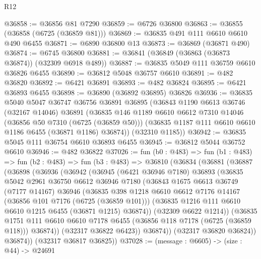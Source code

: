 \begin{lexlean}{R12}
\begin{coremodule}
@36858 := @36856 @81 @7290
@36859 := @6726 @36800
@36863 := @36855 (@36858 (@6725 (@36859 @81)))
@36869 := @36835 @491 @111 @6610 @6610 @490 @6455
@36871 := @6890 @36800 @13
@36873 := @36869 (@36871 @490)
@36874 := @6745 @36800
@36881 := @36841 (@36849 (@36863 (@36873 @36874)) (@32309 @6918 @489))
@36887 := @36835 @5049 @111 @36759 @6610 @36826 @6455
@36890 := @36812 @5048 @36757 @6610
@36891 := @482 @36820
@36892 := @6421 @36891
@36893 := @482 @36824
@36895 := @6421 @36893 @6455
@36898 := @36890 (@36892 @36895) @36826
@36936 := @36835
    @5040
    @5047
    @36747
    @36756
    @36891
    @36895
    (@36843
      @1190
      @6613
      @36746
      (@32167 @14046)
      @36891
      (@36835
        @146
        @1189
        @6610
        @6612
        @7310
        @14046
        (@36856 @50 @7310 (@6725 (@36859 @50)))
        (@36835 @1187 @111 @6610 @6610 @1186 @6455 (@36871 @1186) @36874))
      (@32310 @1185))
@36942 := @36835 @5045 @111 @36754 @6610 @36893 @6455
@36945 := @36812 @5044 @36752 @6610
@36946 := @482 @36822
@37026 := fun (b0 : @483) =>
  fun (b1 : @483) =>
  fun (b2 : @483) =>
  fun (b3 : @483) =>
  @36810
    (@36834
      (@36881
        (@36887
          (@36898
            (@36936
              (@36942
                (@36945
                  (@6421 @36946 @7180)
                  @36893
                  (@36835
                    @5042
                    @2961
                    @36750
                    @6612
                    @36946
                    @7180
                    (@36843
                      @1675
                      @6613
                      @36749
                      (@7177 @14167)
                      @36946
                      (@36835
                        @398
                        @1218
                        @6610
                        @6612
                        @7176
                        @14167
                        (@36856 @101 @7176 (@6725 (@36859 @101)))
                        (@36835 @1216 @111 @6610 @6610 @1215 @6455 (@36871 @1215) @36874))
                      (@32309 @6622 @1214))
                    (@36835
                      @1751
                      @111
                      @6610
                      @6610
                      @7178
                      @6455
                      (@36856 @118 @7178 (@6725 (@36859 @118)))
                      @36874))
                  (@32317 @36822 @6423))
                @36874))
            (@32317 @36820 @36824))
          @36874))
      (@32317 @36817 @36825))
@37028 := (message : @6605) -> (size : @44) -> @24691

\end{coremodule}
\end{lexlean}
